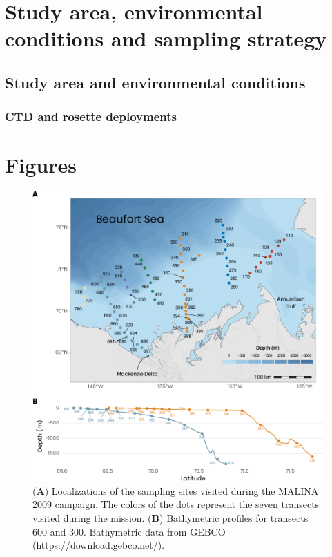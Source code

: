 \documentclass[essd, manuscript]{copernicus}
\begin{document}
\begin{abstract}
    
\end{abstract}


\introduction  %

\section{Study area, environmental conditions and sampling strategy}

\subsection{Study area and environmental conditions}

\subsubsection{CTD and rosette deployments}

\newpage

\section{Figures}

\begin{figure}[H]
    \centering
    \includegraphics[scale = 1]{../../../graphs/fig01.pdf}
    \caption{(\textbf{A}) Localizations of the sampling sites visited during the MALINA 2009 campaign. The colors of the dots represent the seven transects visited during the mission. (\textbf{B}) Bathymetric profiles for transects 600 and 300. Bathymetric data from GEBCO (https://download.gebco.net/).}
\end{figure}
\end{document}
